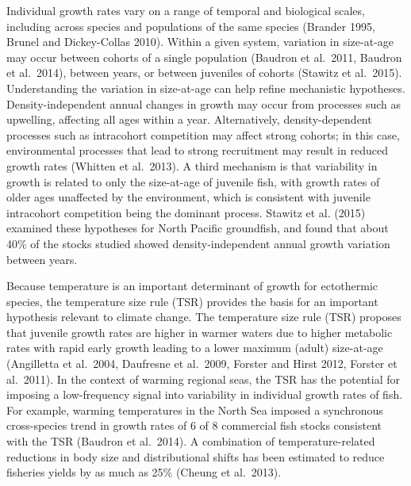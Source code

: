 \documentclass[]{article}
\begin{document}
Individual growth rates vary on a range of temporal and biological
scales, including across species and populations of the same species
(Brander 1995, Brunel and Dickey-Collas 2010). Within a given system,
variation in size-at-age may occur between cohorts of a single
population (Baudron et al.~2011, Baudron et al.~2014), between years, or
between juveniles of cohorts (Stawitz et al.~2015). Understanding the
variation in size-at-age can help refine mechanistic hypotheses.
Density-independent annual changes in growth may occur from processes
such as upwelling, affecting all ages within a year. Alternatively,
density-dependent processes such as intracohort competition may affect
strong cohorts; in this case, environmental processes that lead to
strong recruitment may result in reduced growth rates (Whitten et
al.~2013). A third mechanism is that variability in growth is related to
only the size-at-age of juvenile fish, with growth rates of older ages
unaffected by the environment, which is consistent with juvenile
intracohort competition being the dominant process. Stawitz et al.
(2015) examined these hypotheses for North Pacific groundfish, and found
that about 40\% of the stocks studied showed density-independent annual
growth variation between years.

Because temperature is an important determinant of growth for
ectothermic species, the temperature size rule (TSR) provides the basis
for an important hypothesis relevant to climate change. The temperature
size rule (TSR) proposes that juvenile growth rates are higher in warmer
waters due to higher metabolic rates with rapid early growth leading to
a lower maximum (adult) size-at-age (Angilletta et al.~2004, Daufresne
et al.~2009, Forster and Hirst 2012, Forster et al.~2011). In the
context of warming regional seas, the TSR has the potential for imposing
a low-frequency signal into variability in individual growth rates of
fish. For example, warming temperatures in the North Sea imposed a
synchronous cross-species trend in growth rates of 6 of 8 commercial
fish stocks consistent with the TSR (Baudron et al.~2014). A combination
of temperature-related reductions in body size and distributional shifts
has been estimated to reduce fisheries yields by as much as 25\% (Cheung
et al.~2013).
\end{document}
